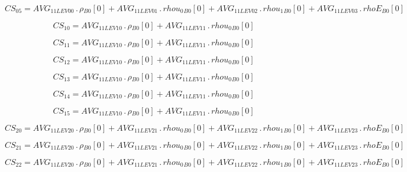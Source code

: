 \documentclass{article}
\begin{document}
\begin{dmath}CS_{05} = AVG_{1 1 LEV 00} \,.\, {\rho{_{B0}}}[{0}] + AVG_{1 1 LEV 01} \,.\, {rhou_{0}{_{B0}}}[{0}] + AVG_{1 1 LEV 02} \,.\, {rhou_{1}{_{B0}}}[{0}] + AVG_{1 1 LEV 03} \,.\, {rhoE{_{B0}}}[{0}]\end{dmath}

\begin{dmath}CS_{10} = AVG_{1 1 LEV 10} \,.\, {\rho{_{B0}}}[{0}] + AVG_{1 1 LEV 11} \,.\, {rhou_{0}{_{B0}}}[{0}]\end{dmath}

\begin{dmath}CS_{11} = AVG_{1 1 LEV 10} \,.\, {\rho{_{B0}}}[{0}] + AVG_{1 1 LEV 11} \,.\, {rhou_{0}{_{B0}}}[{0}]\end{dmath}

\begin{dmath}CS_{12} = AVG_{1 1 LEV 10} \,.\, {\rho{_{B0}}}[{0}] + AVG_{1 1 LEV 11} \,.\, {rhou_{0}{_{B0}}}[{0}]\end{dmath}

\begin{dmath}CS_{13} = AVG_{1 1 LEV 10} \,.\, {\rho{_{B0}}}[{0}] + AVG_{1 1 LEV 11} \,.\, {rhou_{0}{_{B0}}}[{0}]\end{dmath}

\begin{dmath}CS_{14} = AVG_{1 1 LEV 10} \,.\, {\rho{_{B0}}}[{0}] + AVG_{1 1 LEV 11} \,.\, {rhou_{0}{_{B0}}}[{0}]\end{dmath}

\begin{dmath}CS_{15} = AVG_{1 1 LEV 10} \,.\, {\rho{_{B0}}}[{0}] + AVG_{1 1 LEV 11} \,.\, {rhou_{0}{_{B0}}}[{0}]\end{dmath}

\begin{dmath}CS_{20} = AVG_{1 1 LEV 20} \,.\, {\rho{_{B0}}}[{0}] + AVG_{1 1 LEV 21} \,.\, {rhou_{0}{_{B0}}}[{0}] + AVG_{1 1 LEV 22} \,.\, {rhou_{1}{_{B0}}}[{0}] + AVG_{1 1 LEV 23} \,.\, {rhoE{_{B0}}}[{0}]\end{dmath}

\begin{dmath}CS_{21} = AVG_{1 1 LEV 20} \,.\, {\rho{_{B0}}}[{0}] + AVG_{1 1 LEV 21} \,.\, {rhou_{0}{_{B0}}}[{0}] + AVG_{1 1 LEV 22} \,.\, {rhou_{1}{_{B0}}}[{0}] + AVG_{1 1 LEV 23} \,.\, {rhoE{_{B0}}}[{0}]\end{dmath}

\begin{dmath}CS_{22} = AVG_{1 1 LEV 20} \,.\, {\rho{_{B0}}}[{0}] + AVG_{1 1 LEV 21} \,.\, {rhou_{0}{_{B0}}}[{0}] + AVG_{1 1 LEV 22} \,.\, {rhou_{1}{_{B0}}}[{0}] + AVG_{1 1 LEV 23} \,.\, {rhoE{_{B0}}}[{0}]\end{dmath}
\end{document}
